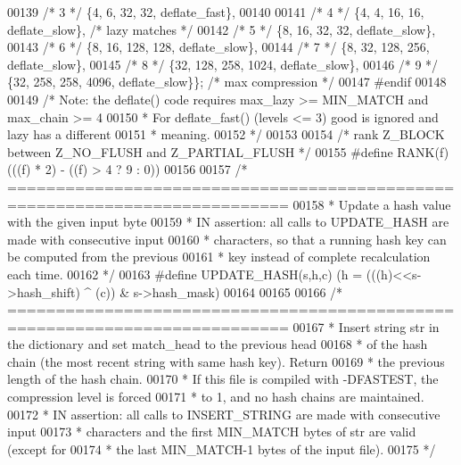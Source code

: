\begin{DoxyCode}
00139 \textcolor{comment}{/* 3 */} \{4,    6, 32,   32, deflate\_fast\},
00140 
00141 \textcolor{comment}{/* 4 */} \{4,    4, 16,   16, deflate\_slow\},  \textcolor{comment}{/* lazy matches */}
00142 \textcolor{comment}{/* 5 */} \{8,   16, 32,   32, deflate\_slow\},
00143 \textcolor{comment}{/* 6 */} \{8,   16, 128, 128, deflate\_slow\},
00144 \textcolor{comment}{/* 7 */} \{8,   32, 128, 256, deflate\_slow\},
00145 \textcolor{comment}{/* 8 */} \{32, 128, 258, 1024, deflate\_slow\},
00146 \textcolor{comment}{/* 9 */} \{32, 258, 258, 4096, deflate\_slow\}\}; \textcolor{comment}{/* max compression */}
00147 \textcolor{preprocessor}{#endif}
00148 
00149 \textcolor{comment}{/* Note: the deflate() code requires max\_lazy >= MIN\_MATCH and max\_chain >= 4}
00150 \textcolor{comment}{ * For deflate\_fast() (levels <= 3) good is ignored and lazy has a different}
00151 \textcolor{comment}{ * meaning.}
00152 \textcolor{comment}{ */}
00153 
00154 \textcolor{comment}{/* rank Z\_BLOCK between Z\_NO\_FLUSH and Z\_PARTIAL\_FLUSH */}
00155 \textcolor{preprocessor}{#define RANK(f) (((f) * 2) - ((f) > 4 ? 9 : 0))}
00156 
00157 \textcolor{comment}{/* ===========================================================================}
00158 \textcolor{comment}{ * Update a hash value with the given input byte}
00159 \textcolor{comment}{ * IN  assertion: all calls to UPDATE\_HASH are made with consecutive input}
00160 \textcolor{comment}{ *    characters, so that a running hash key can be computed from the previous}
00161 \textcolor{comment}{ *    key instead of complete recalculation each time.}
00162 \textcolor{comment}{ */}
00163 \textcolor{preprocessor}{#define UPDATE\_HASH(s,h,c) (h = (((h)<<s->hash\_shift) ^ (c)) & s->hash\_mask)}
00164 
00165 
00166 \textcolor{comment}{/* ===========================================================================}
00167 \textcolor{comment}{ * Insert string str in the dictionary and set match\_head to the previous head}
00168 \textcolor{comment}{ * of the hash chain (the most recent string with same hash key). Return}
00169 \textcolor{comment}{ * the previous length of the hash chain.}
00170 \textcolor{comment}{ * If this file is compiled with -DFASTEST, the compression level is forced}
00171 \textcolor{comment}{ * to 1, and no hash chains are maintained.}
00172 \textcolor{comment}{ * IN  assertion: all calls to INSERT\_STRING are made with consecutive input}
00173 \textcolor{comment}{ *    characters and the first MIN\_MATCH bytes of str are valid (except for}
00174 \textcolor{comment}{ *    the last MIN\_MATCH-1 bytes of the input file).}
00175 \textcolor{comment}{ */}

\end{DoxyCode}
